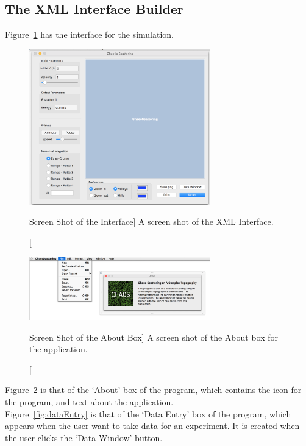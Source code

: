 \documentclass[12pt]{article} %
\begin{document}
\subsection{The XML Interface Builder}

Figure~\ref{fig:choasXML} has the interface for the simulation. 

\begin{figure}[h]
	\centering
	\includegraphics[width=0.7\textwidth]{ChaoticScatteringWindow.png}
	\caption
	[Screen Shot of the Interface]
	{A screen shot of the XML Interface.  }
	\label{fig:choasXML}
\end{figure}

\begin{figure}[h]
	\centering
	\includegraphics[width=0.7\textwidth]{About.png}
	\caption
	[Screen Shot of the About Box]
	{A screen shot of the About box for the application.  }
	\label{fig:about}
\end{figure}

Figure~\ref{fig:about} is that of the `About' box of the program, which contains the icon for the program, and text about the application. \\




Figure~\ref{fig:dataEntry} is that of the `Data Entry' box of the program, which appears when the user want to take data for an experiment. It is created when the user clicks the `Data Window' button.\\
\end{document}
